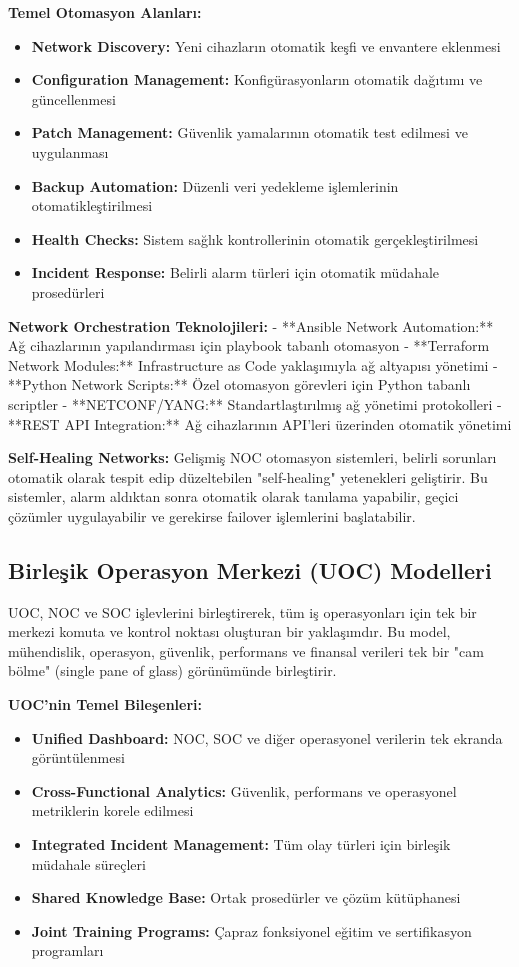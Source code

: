 \textbf{Temel Otomasyon Alanları:}
\begin{itemize}
    \item \textbf{Network Discovery:} Yeni cihazların otomatik keşfi ve envantere eklenmesi
    \item \textbf{Configuration Management:} Konfigürasyonların otomatik dağıtımı ve güncellenmesi
    \item \textbf{Patch Management:} Güvenlik yamalarının otomatik test edilmesi ve uygulanması
    \item \textbf{Backup Automation:} Düzenli veri yedekleme işlemlerinin otomatikleştirilmesi
    \item \textbf{Health Checks:} Sistem sağlık kontrollerinin otomatik gerçekleştirilmesi
    \item \textbf{Incident Response:} Belirli alarm türleri için otomatik müdahale prosedürleri
\end{itemize}

\textbf{Network Orchestration Teknolojileri:}
- **Ansible Network Automation:** Ağ cihazlarının yapılandırması için playbook tabanlı otomasyon
- **Terraform Network Modules:** Infrastructure as Code yaklaşımıyla ağ altyapısı yönetimi
- **Python Network Scripts:** Özel otomasyon görevleri için Python tabanlı scriptler
- **NETCONF/YANG:** Standartlaştırılmış ağ yönetimi protokolleri
- **REST API Integration:** Ağ cihazlarının API'leri üzerinden otomatik yönetimi

\textbf{Self-Healing Networks:}
Gelişmiş NOC otomasyon sistemleri, belirli sorunları otomatik olarak tespit edip düzeltebilen "self-healing" yetenekleri geliştirir. Bu sistemler, alarm aldıktan sonra otomatik olarak tanılama yapabilir, geçici çözümler uygulayabilir ve gerekirse failover işlemlerini başlatabilir.

\subsection{Birleşik Operasyon Merkezi (UOC) Modelleri}

UOC, NOC ve SOC işlevlerini birleştirerek, tüm iş operasyonları için tek bir merkezi komuta ve kontrol noktası oluşturan bir yaklaşımdır. Bu model, mühendislik, operasyon, güvenlik, performans ve finansal verileri tek bir "cam bölme" (single pane of glass) görünümünde birleştirir.

\textbf{UOC'nin Temel Bileşenleri:}
\begin{itemize}
    \item \textbf{Unified Dashboard:} NOC, SOC ve diğer operasyonel verilerin tek ekranda görüntülenmesi
    \item \textbf{Cross-Functional Analytics:} Güvenlik, performans ve operasyonel metriklerin korele edilmesi
    \item \textbf{Integrated Incident Management:} Tüm olay türleri için birleşik müdahale süreçleri
    \item \textbf{Shared Knowledge Base:} Ortak prosedürler ve çözüm kütüphanesi
    \item \textbf{Joint Training Programs:} Çapraz fonksiyonel eğitim ve sertifikasyon programları
\end{itemize}

